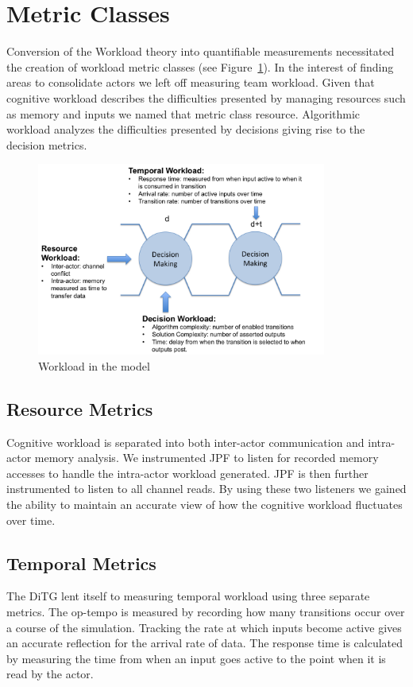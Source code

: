 \section{Metric Classes}
Conversion of the Workload theory into quantifiable measurements necessitated the creation of workload metric classes (see Figure~\ref{fig:WorkloadMetrics}). In the interest of finding areas to consolidate actors we left off measuring team workload. Given that cognitive workload describes the difficulties presented by managing resources such as memory and inputs we named that metric class resource. Algorithmic workload analyzes the difficulties presented by decisions giving rise to the decision metrics.


\begin{figure}[h]
\center
\setlength{\abovecaptionskip}{1mm}
\setlength{\belowcaptionskip}{1mm}
\setlength{\textfloatsep}{1mm}
\setlength{\floatsep}{1mm}
\includegraphics[height=2.5in]{WorkloadMetrics.png}
\caption{Workload in the model}
\label{fig:WorkloadMetrics}
\end{figure}

\subsection{Resource Metrics}
Cognitive workload is separated into both inter-actor communication and intra-actor memory analysis. We instrumented JPF to listen for recorded memory accesses to handle the intra-actor workload generated. JPF is then further instrumented to listen to all channel reads. By using these two listeners we gained the ability to maintain an accurate view of how the cognitive workload fluctuates over time.

\subsection{Temporal Metrics}
The DiTG lent itself to measuring temporal workload using three separate metrics. The op-tempo is measured by recording how many transitions occur over a course of the simulation. Tracking the rate at which inputs become active gives an accurate reflection for the arrival rate of data. The response time is calculated by measuring the time from when an input goes active to the point when it is read by the actor.

